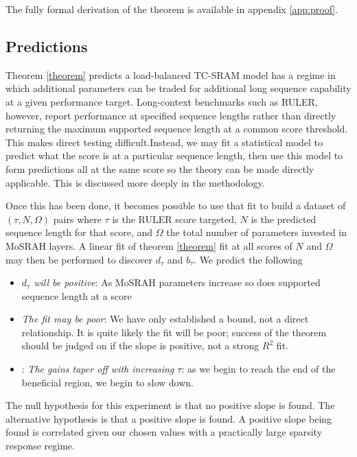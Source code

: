 \documentclass[11pt]{article}
\begin{document}
The fully formal derivation of the theorem is available in appendix \ref{app:proof}.

\subsection{Predictions}

Theorem \ref{theorem} predicts a load-balanced TC-SRAM model has a regime in which additional parameters can be traded for additional long sequence capability at a given performance target.  Long-context benchmarks such as RULER, however, report performance at specified sequence lengths rather than directly returning the maximum supported sequence length at a common score threshold. This makes direct testing difficult.Instead, we may fit a statistical model to predict what the score is at a particular sequence length, then use this model to form predictions all at the same score so the theory can be made directly applicable. This is discussed more deeply in the methodology.

Once this has been done, it becomes possible to use that fit to build a dataset of $(\tau, N, \Omega)$ pairs where $\tau$ is the RULER score targeted, $N$ is the predicted sequence length for that score, and $\Omega$ the total number of parameters invested in MoSRAH layers. A linear fit of theorem \ref{theorem} fit at all scores of $N$ and $\Omega$ may then be performed to discover $d_\tau$ and $b_\tau$. We predict the following

\begin{itemize}
    \item \emph{$d_\tau$ will be positive}: As MoSRAH parameters increase so does supported sequence length at a score
    \item \emph{The fit may be poor}: We have only established a bound, not a direct relationship. It is quite likely the fit will be poor; success of the theorem should be judged on if the slope is positive, not a strong $R^2$ fit.
    \item: \emph{The gains taper off with increasing $\tau$}: as we begin to reach the end of the beneficial region, we begin to slow down.
\end{itemize}

The null hypothesis for this experiment is that no positive slope is found. The alternative hypothesis is that a positive slope is found. A positive slope being found is correlated given our chosen values with a practically large sparsity response regime.
\end{document}

